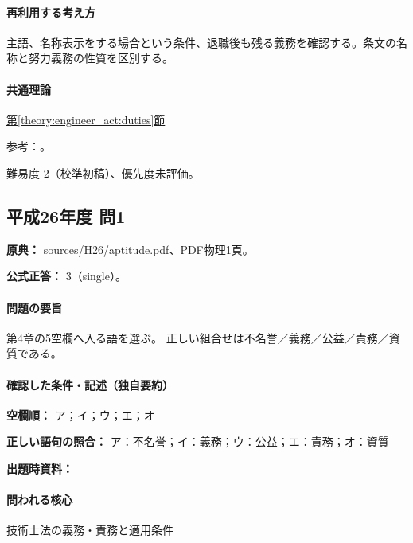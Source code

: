 \paragraph{再利用する考え方} 主語、名称表示をする場合という条件、退職後も残る義務を確認する。条文の名称と努力義務の性質を区別する。

\paragraph{共通理論} \hyperref[theory:engineer_act:duties]{第\ref*{theory:engineer_act:duties}節}

\par 参考：\cite{engineer_act_current}。

\par 難易度 2（校準初稿）、優先度未評価。

\subsection{平成26年度 問1}
\label{q:h26-reg-apt-01}

\noindent\textbf{原典：} sources/H26/aptitude.pdf、PDF物理1頁。

\textbf{公式正答：} 3（single）。

\paragraph{問題の要旨} 第4章の5空欄へ入る語を選ぶ。 正しい組合せは不名誉／義務／公益／責務／資質である。

\paragraph{確認した条件・記述（独自要約）}\mbox{}\par

\noindent\textbf{空欄順：} ア；イ；ウ；エ；オ\par

\noindent\textbf{正しい語句の照合：} ア：不名誉；イ：義務；ウ：公益；エ：責務；オ：資質\par

\noindent\textbf{出題時資料：} \par

\paragraph{問われる核心} 技術士法の義務・責務と適用条件

